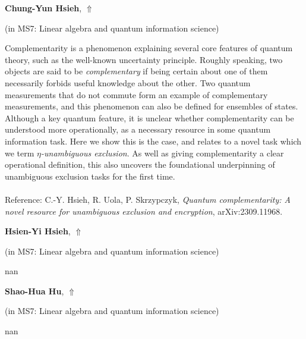 \documentclass[ILAS2025-program.tex]{subfiles}
\begin{document}
     \hypertarget{down0359}{}\begin{ilasabstract}
    
    \textbf{Chung-Yun Hsieh},  \hfill \hyperlink{up0359}{$\Uparrow$}
    
    (in {\color{mstitle}MS7: Linear algebra and quantum information science})
        
        \mtskip
    Complementarity is a phenomenon explaining several core features of quantum theory, such as the well-known uncertainty principle. Roughly speaking, two objects are said to be {\em complementary} if being certain about one of them necessarily forbids useful knowledge about the other. Two quantum measurements that do not commute form an example of complementary measurements, and this phenomenon can also be defined for ensembles of states. Although a key quantum feature, it is unclear whether complementarity can be understood more operationally, as a necessary resource in some quantum information task. Here we show this is the case, and relates to a novel task which we term {\em $\eta$-unambiguous exclusion}. As well as giving complementarity a clear operational definition, this also uncovers the foundational underpinning of unambiguous exclusion tasks for the first time. \\\\
Reference: C.-Y. Hsieh, R. Uola, P. Skrzypczyk, {\em Quantum complementarity: A novel resource for unambiguous exclusion and encryption}, arXiv:2309.11968.
\end{ilasabstract}
     \hypertarget{down0361}{}\begin{ilasabstract}
    
    \textbf{Hsien-Yi Hsieh},  \hfill \hyperlink{up0361}{$\Uparrow$}
    
    (in {\color{mstitle}MS7: Linear algebra and quantum information science})
        
        \mtskip
    nan\end{ilasabstract}
     \hypertarget{down0208}{}\begin{ilasabstract}
    
    \textbf{Shao-Hua Hu},  \hfill \hyperlink{up0208}{$\Uparrow$}
    
    (in {\color{mstitle}MS7: Linear algebra and quantum information science})
        
        \mtskip
    nan\end{ilasabstract}
\end{document}

